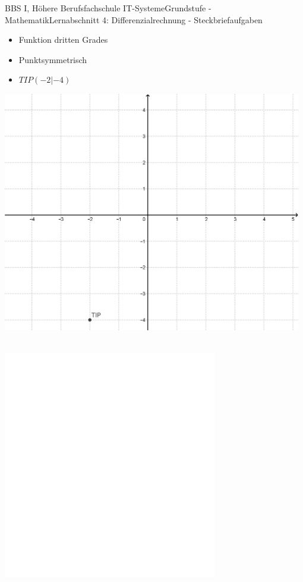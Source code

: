 \documentclass[oneside,openany,headings=optiontotoc,11pt,numbers=noenddot]{scrreprt}
\begin{document}
		\begin{worksheet}{BBS I, Höhere Berufsfachschule IT-Systeme}{Grundstufe - Mathematik}{Lernabschnitt 4: Differenzialrechnung - Steckbriefaufgaben}
			\begin{framed}
				\noindent
				\begin{minipage}{0.28\textwidth}
					\begin{itemize}
						\item Funktion dritten Grades
						\item Punktsymmetrisch
						\item \(TIP(-2|-4)\)
					\end{itemize}
				\end{minipage}
				\hfill
				\begin{minipage}{0.7\textwidth}
					\includegraphics[width=0.98\textwidth,align=t]{../99_Bilder/20190521_StBr.png}
				\end{minipage}\\
				\includegraphics[width=0.7\textwidth]{../../empty.jpg}\\

\end{framed}
\end{worksheet}
\end{document}
